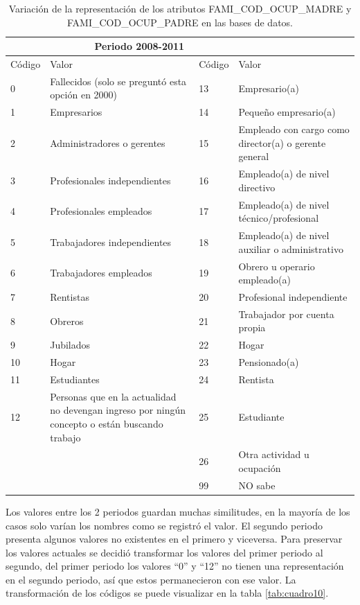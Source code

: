 \begin{itemize}
\begin{table}[!htb]
\centering
\begin{tabular}{|p{1.5cm}|p{6.5cm}|p{1.5cm}|p{6.5cm}|}
\hline
	\rowcolor[gray]{0.9} 
	\multicolumn{2}{|c|}{
	\textbf{Periodo 2000-2004I}} &
	\multicolumn{2}{|c|}{
	\textbf{Periodo 2008-2011}}\\
\hline
	\rowcolor[gray]{0.5}
	Código  & Valor &
	Código  & Valor \\
\hline
0 & Fallecidos (solo se preguntó esta opción en 2000) & 13 & Empresario(a)\\
\hline
1 & Empresarios & 14 & Pequeño empresario(a)\\
\hline
2 & Administradores o gerentes & 15 & Empleado con cargo como director(a) o gerente general\\
\hline
3 & Profesionales independientes & 16 & Empleado(a) de nivel directivo\\
\hline
4 & Profesionales empleados & 17 & Empleado(a) de nivel técnico/profesional\\
\hline
5 & Trabajadores independientes & 18 & Empleado(a) de nivel auxiliar o administrativo\\
\hline
6 & Trabajadores empleados & 19 & Obrero u operario empleado(a)\\
\hline
7 & Rentistas & 20 & Profesional independiente\\ 
\hline
8 & Obreros & 21 & Trabajador por cuenta propia\\
\hline
9 & Jubilados & 22 & Hogar\\
\hline
10 & Hogar & 23 & Pensionado(a)\\
\hline
11 & Estudiantes & 24 & Rentista\\
\hline
12 & Personas que en la actualidad no devengan ingreso por ningún concepto o están buscando trabajo & 25 & Estudiante\\
\hline
& & 26 & Otra actividad u ocupación\\
\hline
& & 99 & NO sabe\\
\hline
\end{tabular}
\caption{Variación de la representación de los atributos FAMI\_COD\_OCUP\_MADRE y FAMI\_COD\_OCUP\_PADRE en las bases de datos.}
\label{tab:cuadro9}
\end{table}
Los valores entre los 2 periodos guardan muchas similitudes, en la mayoría de los casos solo varían los nombres como se registró el valor. El segundo periodo presenta algunos valores no existentes en el primero y viceversa. Para preservar los valores actuales se decidió transformar los valores del primer periodo al segundo, del primer periodo los valores ``0'' y ``12'' no tienen una representación en el segundo periodo, así que estos permanecieron con ese valor. La transformación de los códigos se puede visualizar en la tabla \ref{tab:cuadro10}.


\end{itemize}
